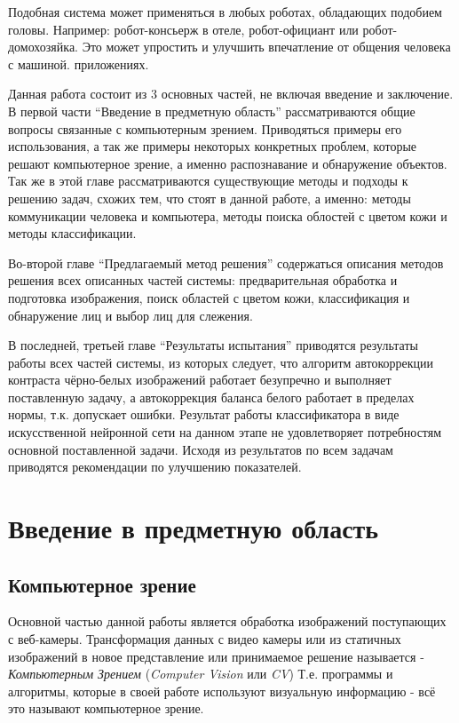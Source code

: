 \documentclass[12pt]{report}
\begin{document}


Подобная система может применяться в любых роботах, обладающих подобием головы.
Например: робот-консьерж в отеле, робот-официант или робот-домохозяйка. Это может упростить и улучшить
впечатление от общения человека с машиной. 
приложениях.

Данная работа состоит из 3 основных частей, не включая введение и заключение. В первой части ``Введение в 
предметную область'' рассматриваются общие вопросы связанные с компьютерным зрением. Приводяться примеры его 
использования, а так же примеры некоторых конкретных проблем, которые решают компьютерное зрение, а именно 
распознавание и обнаружение объектов. Так же в этой главе рассматриваются существующие методы и подходы к решению 
задач, схожих тем, что стоят в данной работе, а именно: методы коммуникации человека и компьютера, методы поиска 
облостей с цветом кожи и методы классификации. 

Во-второй главе ``Предлагаемый метод решения'' содержаться описания методов решения всех описанных частей системы: 
предварительная обработка и подготовка изображения, поиск областей с цветом кожи, классификация и обнаружение лиц и 
выбор лиц для слежения.

В последней, третьей главе ``Результаты испытания'' приводятся результаты работы всех частей системы, из которых 
следует, что алгоритм автокоррекции контраста чёрно-белых изображений работает безупречно и выполняет поставленную 
задачу, а автокоррекция баланса белого работает в пределах нормы, т.к. допускает ошибки. Результат работы 
классификатора в виде искусственной нейронной сети на данном этапе не удовлетворяет потребностям основной 
поставленной задачи. Исходя из результатов по всем задачам приводятся рекомендации по улучшению показателей. 

\chapter{Введение в предметную область}
\thispagestyle{fancy}

\section{Компьютерное зрение}

Основной частью данной работы является обработка изображений поступающих с веб-камеры. Трансформация данных с видео 
камеры или из статичных изображений в новое представление или принимаемое решение называется - \emph{Компьютерным 
Зрением} (\textit{Computer Vision} или \textit{CV})\citep{bradski2008learning} Т.е. программы и алгоритмы, которые 
в 
своей работе используют визуальную информацию - всё это называют компьютерное зрение.
\end{document}
